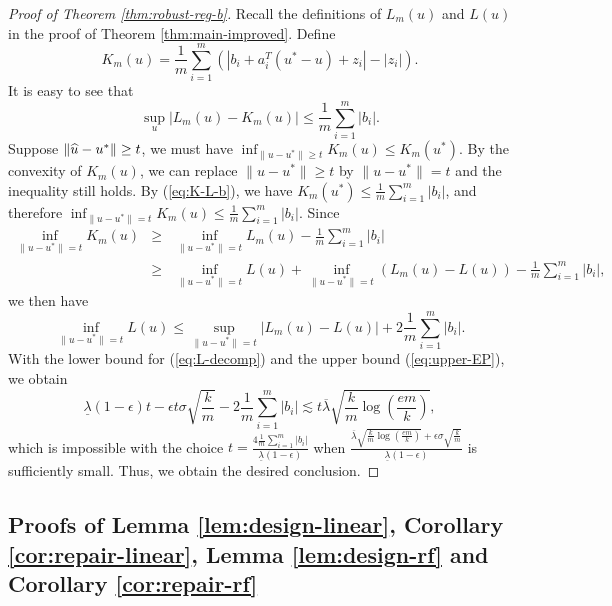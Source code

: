 \begin{proof}[Proof of Theorem \ref{thm:robust-reg-b}]
Recall the definitions of $L_m(u)$ and $L(u)$ in the proof of Theorem \ref{thm:main-improved}. Define
$$K_m(u)=\frac{1}{m}\sum_{i=1}^m\left(|b_i+a_i^T(u^*-u)+z_i|-|z_i|\right).$$
It is easy to see that
\begin{equation}
\sup_u|L_m(u)-K_m(u)|\leq \frac{1}{m}\sum_{i=1}^m|b_i|.\label{eq:K-L-b}
\end{equation}
Suppose $\|\widehat{u}-u^*\|\geq t$, we must have $\inf_{\|u-u^*\|\geq t}K_m(u) \leq K_m(u^*)$.
By the convexity of $K_m(u)$, we can replace $\|u-u^*\|\geq t$ by $\|u-u^*\| = t$ and the inequality still holds. By (\ref{eq:K-L-b}), we have $K_m(u^*)\leq \frac{1}{m}\sum_{i=1}^m|b_i|$, and therefore $\inf_{\|u-u^*\|= t}K_m(u)\leq \frac{1}{m}\sum_{i=1}^m|b_i|$. Since
\begin{eqnarray*}
\inf_{\|u-u^*\|= t}K_m(u) &\geq& \inf_{\|u-u^*\|= t}L_m(u) - \frac{1}{m}\sum_{i=1}^m|b_i| \\
&\geq& \inf_{\|u-u^*\|=t}L(u) + \inf_{\|u-u^*\|= t}(L_m(u)-L(u)) - \frac{1}{m}\sum_{i=1}^m|b_i|,
\end{eqnarray*}
we then have
\begin{equation}
\inf_{\|u-u^*\|=t}L(u) \leq \sup_{\|u-u^*\|= t}|L_m(u)-L(u)| + 2\frac{1}{m}\sum_{i=1}^m|b_i|. %
\end{equation}
With the lower bound for (\ref{eq:L-decomp}) and the upper bound (\ref{eq:upper-EP}), we obtain
$$\underline{\lambda}(1-\epsilon)t - \epsilon t\sigma\sqrt{\frac{k}{m}} - 2\frac{1}{m}\sum_{i=1}^m|b_i|\lesssim t\overline{\lambda}\sqrt{\frac{k}{m}\log\left(\frac{em}{k}\right)},$$
which is impossible with the choice $t=\frac{4\frac{1}{m}\sum_{i=1}^m|b_i|}{\underline{\lambda}(1-\epsilon)}$ when $\frac{\overline{\lambda}\sqrt{\frac{k}{m}\log\left(\frac{em}{k}\right)}+\epsilon\sigma\sqrt{\frac{k}{m}}}{\underline{\lambda}(1-\epsilon)}$ is sufficiently small. Thus, we obtain the desired conclusion.
\end{proof}


\subsection{Proofs of Lemma \ref{lem:design-linear}, Corollary \ref{cor:repair-linear}, Lemma \ref{lem:design-rf} and Corollary \ref{cor:repair-rf}}


